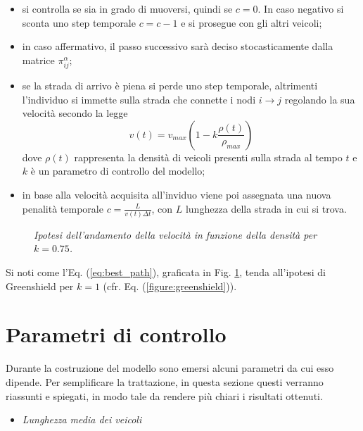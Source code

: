 \documentclass[../main.tex]{subfiles}
\begin{document}
\begin{itemize}
    \item si controlla se sia in grado di muoversi, quindi se $c = 0$. In caso negativo si sconta uno step temporale $c = c -1$ e si prosegue con gli altri veicoli;
    \item in caso affermativo, il passo successivo sarà deciso stocasticamente dalla matrice $\pi_{ij}^{\alpha}$;
    \item se la strada di arrivo \`e piena si perde uno step temporale, altrimenti l'individuo si immette sulla strada che connette i nodi $i \to j$ regolando la sua velocit\`a secondo la legge 
    \begin{equation}
        v(t) = v_{max}\left(1-k\frac{\rho(t)}{\rho_{max}}\right)
    \end{equation}
    dove $\rho(t)$ rappresenta la densit\`a di veicoli presenti sulla strada al tempo $t$ e $k$ \`e un parametro di controllo del modello;
    \item in base alla velocit\`a acquisita all'inviduo viene poi assegnata una nuova penalit\`a temporale $c = \frac{L}{v(t)\Delta t}$, con $L$ lunghezza della strada in cui si trova.
\end{itemize}
\begin{figure}[H]
    \centering
    \caption[Velocit\`a nel modello]{\emph{Ipotesi dell'andamento della velocit\`a in funzione della densit\`a per $k = 0.75$.}}
    \label{figure:velocity}
\end{figure}
Si noti come l'Eq. (\ref{eq:best_path}), graficata in Fig. \ref{figure:velocity}, tenda all'ipotesi di Greenshield per $k = 1$ (cfr. Eq. (\ref{figure:greenshield})).

\section{Parametri di controllo}
Durante la costruzione del modello sono emersi alcuni parametri da cui esso dipende.
Per semplificare la trattazione, in questa sezione questi verranno riassunti e spiegati, in modo tale da rendere pi\`u chiari i risultati ottenuti.

\begin{itemize}
    \item \emph{Lunghezza media dei veicoli}
\end{itemize}
\end{document}

